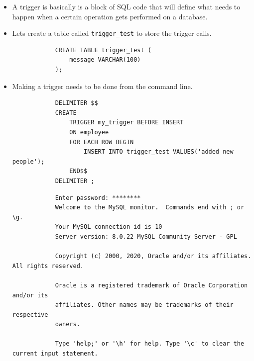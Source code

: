 \begin{itemize}
    \item A trigger is basically is a block of SQL code that will define what needs to happen when a certain operation gets performed on a database.
    
    \item Lets create a table called \verb|trigger_test| to store the trigger calls.
        \begin{verbatim}
            CREATE TABLE trigger_test (
                message VARCHAR(100)
            );
        \end{verbatim}

    \item Making a trigger needs to be done from the command line.
        \begin{verbatim}
            DELIMITER $$ 
            CREATE 
                TRIGGER my_trigger BEFORE INSERT 
                ON employee
                FOR EACH ROW BEGIN 
                    INSERT INTO trigger_test VALUES('added new people');
                END$$
            DELIMITER ;
        \end{verbatim}
        \begin{verbatim}
            Enter password: ********
            Welcome to the MySQL monitor.  Commands end with ; or \g.
            Your MySQL connection id is 10
            Server version: 8.0.22 MySQL Community Server - GPL

            Copyright (c) 2000, 2020, Oracle and/or its affiliates. All rights reserved.

            Oracle is a registered trademark of Oracle Corporation and/or its
            affiliates. Other names may be trademarks of their respective
            owners.

            Type 'help;' or '\h' for help. Type '\c' to clear the current input statement.


\end{verbatim}
\end{itemize}
